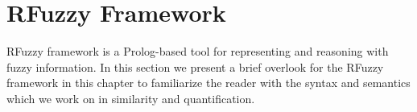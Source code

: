 \documentclass[egilmezThesis.tex]{subfiles}
\begin{document}
\section{RFuzzy Framework}
\label{chap:RFuzzyFramework}
RFuzzy framework is a Prolog-based tool for representing and reasoning with fuzzy information. In this section we present a brief overlook for the RFuzzy framework \cite{MPS10} in this chapter to familiarize the reader with the syntax and semantics which we work on in similarity and quantification. 




\end{document}
